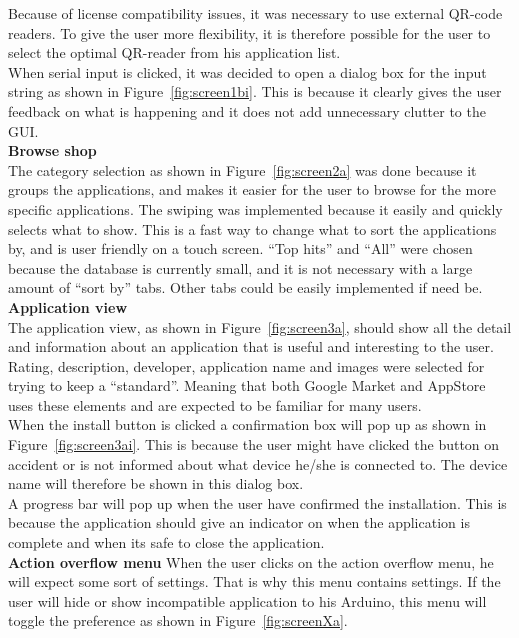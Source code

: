 	Because of license compatibility issues, it was necessary to use external QR-code readers. To give the user more flexibility, it is therefore possible for the user to select the optimal QR-reader from his application list.\\

	When serial input is clicked, it was decided to open a dialog box for the input string as shown in Figure~\ref{fig:screen1bi}. This is because it clearly gives the user feedback on what is happening and it does not add unnecessary clutter to the GUI.\\

	\textbf{Browse shop}\\
	The category selection as shown in Figure~\ref{fig:screen2a} was done because it groups the applications, and makes it easier for the user to browse for the more specific applications. The swiping was implemented because it easily and quickly selects what to show. This is a fast way to change what to sort the applications by, and is user friendly on a touch screen. ``Top hits'' and ``All'' were chosen because the database is currently small, and it is not necessary with a large amount of ``sort by'' tabs. Other tabs could be easily implemented if need be.\\

	\textbf{Application view}\\
	The application view, as shown in Figure~\ref{fig:screen3a}, should show all the detail and information about an application that is useful and interesting to the user. Rating, description, developer, application name and images were selected for trying to keep a ``standard''. Meaning that both Google Market and AppStore uses these elements and are expected to be familiar for many users.\\

	When the install button is clicked a confirmation box will pop up as shown in Figure~\ref{fig:screen3ai}. This is because the user might have clicked the button on accident or is not informed about what device he/she is connected to. The device name will therefore be shown in this dialog box.\\

	A progress bar will pop up when the user have confirmed the installation. This is because the application should give an indicator on when the application is complete and when its safe to close the application. \\

	\textbf{Action overflow menu}
	When the user clicks on the action overflow menu, he will expect some sort of settings. That is why this menu contains settings. If the user will hide or show incompatible application to his Arduino, this menu will toggle the preference as shown in Figure~\ref{fig:screenXa}.\\

